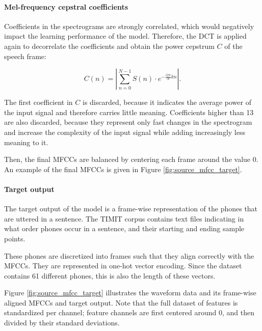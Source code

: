 		\paragraph{Mel-frequency cepstral coefficients}

			Coefficients in the spectrograms are strongly correlated, which would negatively impact the learning performance of the model.
			Therefore, the DCT is applied again to decorrelate the coefficients and obtain the power cepstrum $C$ of the speech frame:

			\begin{equation}
				C(n) = \left|\sum_{n=0}^{N-1}S(n)\cdot e^{-\frac{i2\pi}{N}kn}\right|.
			\end{equation}

			The first coefficient in $C$ is discarded, because it indicates the average power of the input signal and therefore carries little meaning.
			Coefficients higher than 13 are also discarded, because they represent only fast changes in the spectrogram and increase the complexity of the input signal while adding increasingly less meaning to it.

			Then, the final MFCCs are balanced by centering each frame around the value 0.
			An example of the final MFCCs is given in Figure \ref{fig:source_mfcc_target}.

		\paragraph{Target output}

			The target output of the model is a frame-wise representation of the phones that are uttered in a sentence.
			The TIMIT corpus contains text files indicating in what order phones occur in a sentence, and their starting and ending sample points.

			These phones are discretized into frames such that they align correctly with the MFCCs.
			They are represented in one-hot vector encoding.
			Since the dataset contains 61 different phones, this is also the length of these vectors.

			Figure \ref{fig:source_mfcc_target} illustrates the waveform data and its frame-wise aligned MFCCs and target output.
			Note that the full dataset of features is standardized per channel; feature channels are first centered around 0, and then divided by their standard deviations.

